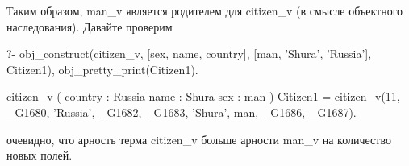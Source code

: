 \documentclass[a4paper]{book}
\begin{document}
Таким образом, man_v является родителем для citizen_v (в смысле
объектного наследования). Давайте проверим

\begin{example}{}{}
?- obj_construct(citizen_v, [sex, name, country], 
                 [man, 'Shura', 'Russia'], Citizen1), 
   obj_pretty_print(Citizen1).

citizen_v ( 
  country : Russia 
  name : Shura 
  sex : man 
) 
Citizen1 = citizen_v(11, _G1680, 'Russia', _G1682, _G1683, 'Shura', man, _G1686, _G1687).
\end{example}

очевидно, что арность терма citizen_v больше арности man_v на
количество новых полей. 

\begin{comment}
Давайте теперь создадим два гражданина и поженим.

\begin{bigexample}{}{}
?- obj_construct(citizen_v, [sex, name, surname, country], 
                 [man, 'Shura', 'Buravin', 'Russia'], A), 
   obj_construct(citizen_v, [sex, name, surname, country], 
                 [woman, 'Oksana', 'Mazur', 'Ukraine'], B), 
   zagz(A, B, woman, A2, B2), 
   obj_pretty_print(A2), 
   obj_pretty_print(B2).

citizen_v ( 
  sex : man 
  name : Shura 
  surname : Mazur 
  country : Russia 
) 
citizen_v ( 
  sex : woman 
  name : Oksana 
  surname : Mazur 
  country : Ukraine 
) 
\end{bigexample}

(в дальнейшем мы будем опускать полный Пролог вывод и
довольствоваться pretty-print-ом). На лицо изменение состояния
граждан. Хотя предикат zagz, изначально, умел работать только с
людьми (man_v).

Давайте рассмотрим ``живой'' пример. Предположим, что теперь
кто-то захотел доработать zagz и предложил следующую модификацию:
гражданство (поле country) в результате брака должно
модифицироваться; то есть, в результате брака A и B гражданство
A должно дополняться гражданством B и наоборот.

Для этого придётся использовать списки в полях country. Пока мы
не задали жёстко типы полей, определение объекта изменять не
нужно (надо только поменять соглашения его использования. На
практике, конечно, нужно предусмотреть оба варианта - гражданство
как значение и гражданство как список, но для простоты примеров
будем полагать, что поле country, если определено, то это всегда
список).


\end{comment}
\end{document}
